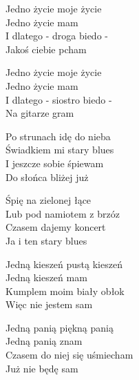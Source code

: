 \begin{text}
    Jedno życie moje życie\\
    Jedno życie mam\\
    I dlatego - droga biedo -\\
    Jakoś ciebie pcham

    Jedno życie moje życie\\
    Jedno życie mam\\
    I dlatego - siostro biedo -\\
    Na gitarze gram

    Po strunach idę do nieba\\
    Świadkiem mi stary blues\\
    I jeszcze sobie śpiewam\\
    Do słońca bliżej już

    Śpię na zielonej łące\\
    Lub pod namiotem z brzóz\\
    Czasem dajemy koncert\\
    Ja i ten stary blues

    Jedną kieszeń pustą kieszeń\\
    Jedną kieszeń mam\\
    Kumplem moim biały obłok\\
    Więc nie jestem sam

    Jedną panią piękną panią\\
    Jedną panią znam\\
    Czasem do niej się uśmiecham\\
    Już nie będę sam
\end{text}
\begin{chord}

\end{chord}